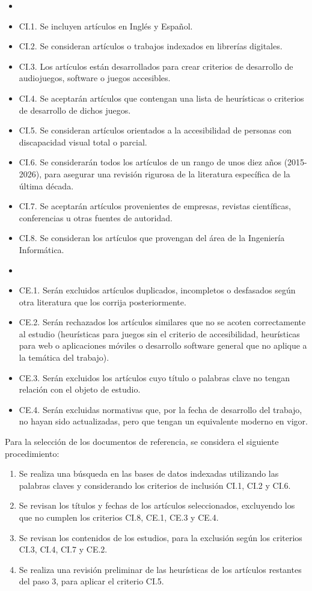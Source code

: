  \begin{itemize}
 	\item [\textbf{Inclusión:}]
 	\item  CI.1. Se incluyen artículos en Inglés y Español.
 	\item  CI.2. Se consideran artículos o trabajos indexados en librerías digitales.
 	\item  CI.3. Los artículos están desarrollados para crear criterios de desarrollo de audiojuegos, software o juegos accesibles.
 	\item  CI.4. Se aceptarán artículos que contengan una lista de heurísticas o criterios de desarrollo de dichos juegos.
 	\item  CI.5. Se consideran artículos orientados a la accesibilidad de personas con discapacidad visual total o parcial.
	\item  CI.6. Se considerarán todos los artículos de un rango de unos diez años (2015-2026), para asegurar una revisión rigurosa de la literatura específica de la última década.
	\item  CI.7. Se aceptarán artículos provenientes de empresas, revistas científicas, conferencias u otras fuentes de autoridad.
	\item CI.8. Se consideran los artículos que provengan del área de la Ingeniería Informática.
	\item [\textbf{Exclusión:}]
	\item  CE.1. Serán excluidos artículos duplicados, incompletos o desfasados según otra literatura que los corrija posteriormente.
	\item  CE.2. Serán rechazados los artículos similares que no se acoten correctamente al estudio (heurísticas para juegos sin el criterio de accesibilidad, heurísticas para web o aplicaciones móviles o desarrollo software general que no aplique a la temática del trabajo).
	\item  CE.3. Serán excluidos los artículos cuyo título o palabras clave no tengan relación con el objeto de estudio.
	\item CE.4. Serán excluidas normativas que, por la fecha de desarrollo del trabajo, no hayan sido actualizadas, pero que tengan un equivalente moderno en vigor.
\end{itemize}
 Para la selección de los documentos de referencia, se considera el siguiente procedimiento:
 \begin{enumerate}
 	\item Se realiza una búsqueda en las bases de datos indexadas utilizando las palabras claves y considerando los criterios de inclusión CI.1, CI.2 y CI.6.
 	\item Se revisan los títulos y fechas de los artículos seleccionados, excluyendo los que no cumplen los criterios CI.8, CE.1, CE.3 y CE.4.
 	\item Se revisan los contenidos de los estudios, para la exclusión según los criterios CI.3, CI.4, CI.7 y CE.2. 
 	\item Se realiza una revisión preliminar de las heurísticas de los artículos restantes del paso 3, para aplicar el criterio CI.5.
 \end{enumerate}


